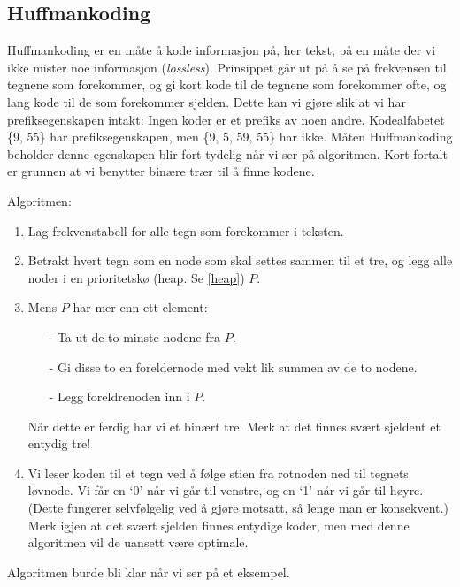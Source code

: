 	\subsection{\color{red}Huffmankoding}\label{huffman}
		Huffmankoding er en måte å kode informasjon på, her tekst, på en måte der vi ikke mister noe informasjon (\textit{lossless}). Prinsippet går ut på å se på frekvensen til tegnene som forekommer, og gi kort kode til de tegnene som forekommer ofte, og lang kode til de som forekommer sjelden. Dette kan vi gjøre slik at vi har prefiksegenskapen intakt: Ingen koder er et prefiks av noen andre. Kodealfabetet \{9, 55\} har prefiksegenskapen, men \{9, 5, 59, 55\} har ikke. Måten Huffmankoding beholder denne egenskapen blir fort tydelig når vi ser på algoritmen. Kort fortalt er grunnen at vi benytter binære trær til å finne kodene.
		
		Algoritmen:
		\begin{enumerate}
			\item Lag frekvenstabell for alle tegn som forekommer i teksten.
			\item Betrakt hvert tegn som en node som skal settes sammen til et tre, og legg alle noder i en prioritetskø (heap. Se \ref{heap}) $P$.
			\item Mens $P$ har mer enn ett element:
				\begin{itemize}
					\item[-] Ta ut de to minste nodene fra $P$.	
					\item[-] Gi disse to en foreldernode med vekt lik summen av de to nodene.	
					\item[-] Legg foreldrenoden inn i $P$.	
				\end{itemize}
				Når dette er ferdig har vi et binært tre. Merk at det finnes svært sjeldent et entydig tre!
			\item Vi leser koden til et tegn ved å følge stien fra rotnoden ned til tegnets løvnode. Vi får en `0' når vi går til venstre, og en `1' når vi går til høyre. (Dette fungerer selvfølgelig ved å gjøre motsatt, så lenge man er konsekvent.) Merk igjen at det svært sjelden finnes entydige koder, men med denne algoritmen vil de uansett være optimale.
		\end{enumerate}
		Algoritmen burde bli klar når vi ser på et eksempel.

